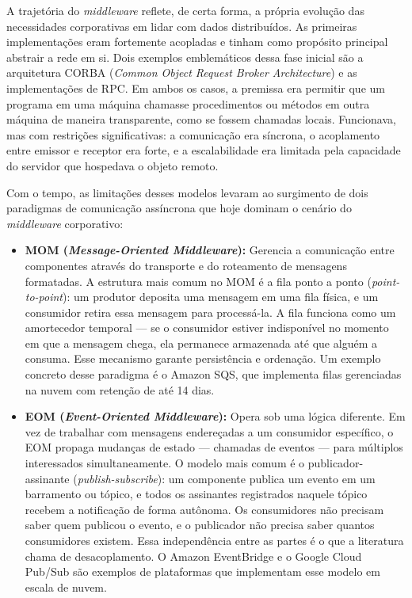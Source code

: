 \documentclass[12pt, a4paper]{article}
\begin{document}
A trajetória do \textit{middleware} reflete, de certa forma, a própria evolução das necessidades corporativas em lidar com dados distribuídos. As primeiras implementações eram fortemente acopladas e tinham como propósito principal abstrair a rede em si. Dois exemplos emblemáticos dessa fase inicial são a arquitetura CORBA (\textit{Common Object Request Broker Architecture}) e as implementações de RPC. Em ambos os casos, a premissa era permitir que um programa em uma máquina chamasse procedimentos ou métodos em outra máquina de maneira transparente, como se fossem chamadas locais. Funcionava, mas com restrições significativas: a comunicação era síncrona, o acoplamento entre emissor e receptor era forte, e a escalabilidade era limitada pela capacidade do servidor que hospedava o objeto remoto.

Com o tempo, as limitações desses modelos levaram ao surgimento de dois paradigmas de comunicação assíncrona que hoje dominam o cenário do \textit{middleware} corporativo:

\begin{itemize}
    \item \textbf{MOM (\textit{Message-Oriented Middleware}):} Gerencia a comunicação entre componentes através do transporte e do roteamento de mensagens formatadas. A estrutura mais comum no MOM é a fila ponto a ponto (\textit{point-to-point}): um produtor deposita uma mensagem em uma fila física, e um consumidor retira essa mensagem para processá-la. A fila funciona como um amortecedor temporal --- se o consumidor estiver indisponível no momento em que a mensagem chega, ela permanece armazenada até que alguém a consuma. Esse mecanismo garante persistência e ordenação. Um exemplo concreto desse paradigma é o Amazon SQS, que implementa filas gerenciadas na nuvem com retenção de até 14 dias.

    \item \textbf{EOM (\textit{Event-Oriented Middleware}):} Opera sob uma lógica diferente. Em vez de trabalhar com mensagens endereçadas a um consumidor específico, o EOM propaga mudanças de estado --- chamadas de eventos --- para múltiplos interessados simultaneamente. O modelo mais comum é o publicador-assinante (\textit{publish-subscribe}): um componente publica um evento em um barramento ou tópico, e todos os assinantes registrados naquele tópico recebem a notificação de forma autônoma. Os consumidores não precisam saber quem publicou o evento, e o publicador não precisa saber quantos consumidores existem. Essa independência entre as partes é o que a literatura chama de desacoplamento. O Amazon EventBridge \cite{amazon2022} e o Google Cloud Pub/Sub são exemplos de plataformas que implementam esse modelo em escala de nuvem.
\end{itemize}
\end{document}
